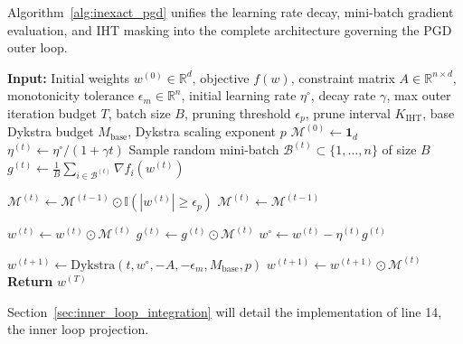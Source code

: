 Algorithm~\ref{alg:inexact_pgd} unifies the learning rate decay, mini-batch gradient evaluation, and IHT masking into the complete architecture governing the PGD outer loop.

\begin{algorithm}[H]
\caption{Inexact Projected Gradient Descent Framework}
\label{alg:inexact_pgd}
\begin{algorithmic}[1]
\State \textbf{Input:} Initial weights $w^{(0)} \in \mathbb{R}^d$, objective $f(w)$, constraint matrix $A \in \mathbb{R}^{n \times d}$, monotonicity tolerance $\epsilon_m \in \mathbb{R}^n$, initial learning rate $\eta^\circ$, decay rate $\gamma$, max outer iteration budget $T$, batch size $B$, pruning threshold $\epsilon_p$, prune interval $K_{\mathrm{IHT}}$, base Dykstra budget $M_{\mathrm{base}}$, Dykstra scaling exponent $p$
\State $\mathcal{M}^{(0)} \gets \mathbf{1}_d$ 
    \State $\eta^{(t)} \gets \eta^\circ / (1 + \gamma t)$ 
    \State Sample random mini-batch $\mathcal{B}^{(t)} \subset \{1, \dots, n\}$ of size $B$
    \State $g^{(t)} \gets \frac{1}{B} \sum_{i \in \mathcal{B}^{(t)}} \nabla f_i(w^{(t)})$ 
    
        \State $\mathcal{M}^{(t)} \gets \mathcal{M}^{(t-1)} \odot \mathbb{I}(|w^{(t)}| \ge \epsilon_p)$ 
    \Else
        \State $\mathcal{M}^{(t)} \gets \mathcal{M}^{(t-1)}$ 
    \EndIf
    
    \State $w^{(t)} \gets w^{(t)} \odot \mathcal{M}^{(t)}$ 
    \State $g^{(t)} \gets g^{(t)} \odot \mathcal{M}^{(t)}$ 
    \State $w^\circ \gets w^{(t)} - \eta^{(t)} g^{(t)}$ 
    
    \State $w^{(t+1)} \gets \mathrm{Dykstra}(t, w^\circ, -A, -\epsilon_m, M_{\mathrm{base}}, p)$ 
    \State $w^{(t+1)} \gets w^{(t+1)} \odot \mathcal{M}^{(t)}$ 
\EndFor
\State \textbf{Return} $w^{(T)}$
\end{algorithmic}
\end{algorithm}

Section~\ref{sec:inner_loop_integration} will detail the implementation of line 14, the inner loop projection.

